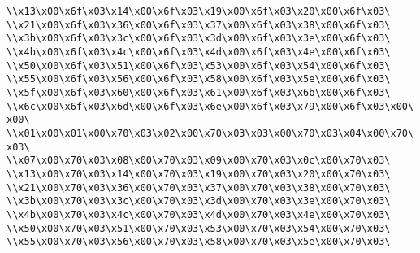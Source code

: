 \verb|\\x13\x00\x6f\x03\x14\x00\x6f\x03\x19\x00\x6f\x03\x20\x00\x6f\x03\|\newline
\verb|\\x21\x00\x6f\x03\x36\x00\x6f\x03\x37\x00\x6f\x03\x38\x00\x6f\x03\|\newline
\verb|\\x3b\x00\x6f\x03\x3c\x00\x6f\x03\x3d\x00\x6f\x03\x3e\x00\x6f\x03\|\newline
\verb|\\x4b\x00\x6f\x03\x4c\x00\x6f\x03\x4d\x00\x6f\x03\x4e\x00\x6f\x03\|\newline
\verb|\\x50\x00\x6f\x03\x51\x00\x6f\x03\x53\x00\x6f\x03\x54\x00\x6f\x03\|\newline
\verb|\\x55\x00\x6f\x03\x56\x00\x6f\x03\x58\x00\x6f\x03\x5e\x00\x6f\x03\|\newline
\verb|\\x5f\x00\x6f\x03\x60\x00\x6f\x03\x61\x00\x6f\x03\x6b\x00\x6f\x03\|\newline
\verb|\\x6c\x00\x6f\x03\x6d\x00\x6f\x03\x6e\x00\x6f\x03\x79\x00\x6f\x03\x00\x00\|\newline
\verb|\\x01\x00\x01\x00\x70\x03\x02\x00\x70\x03\x03\x00\x70\x03\x04\x00\x70\x03\|\newline
\verb|\\x07\x00\x70\x03\x08\x00\x70\x03\x09\x00\x70\x03\x0c\x00\x70\x03\|\newline
\verb|\\x13\x00\x70\x03\x14\x00\x70\x03\x19\x00\x70\x03\x20\x00\x70\x03\|\newline
\verb|\\x21\x00\x70\x03\x36\x00\x70\x03\x37\x00\x70\x03\x38\x00\x70\x03\|\newline
\verb|\\x3b\x00\x70\x03\x3c\x00\x70\x03\x3d\x00\x70\x03\x3e\x00\x70\x03\|\newline
\verb|\\x4b\x00\x70\x03\x4c\x00\x70\x03\x4d\x00\x70\x03\x4e\x00\x70\x03\|\newline
\verb|\\x50\x00\x70\x03\x51\x00\x70\x03\x53\x00\x70\x03\x54\x00\x70\x03\|\newline
\verb|\\x55\x00\x70\x03\x56\x00\x70\x03\x58\x00\x70\x03\x5e\x00\x70\x03\|\newline
